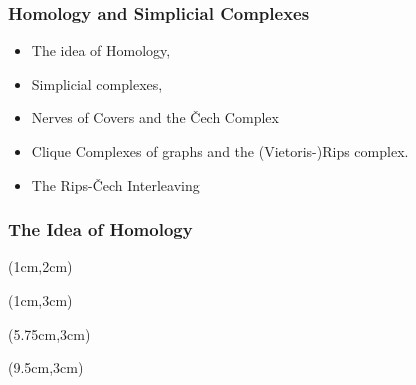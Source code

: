 
\begin{frame}
  \frametitle{Homology and Simplicial Complexes}

  \begin{itemize}
    \item The idea of Homology,
    \item Simplicial complexes,
    \item Nerves of Covers and the \v Cech Complex
    \item Clique Complexes of graphs and the (Vietoris-)Rips complex.
    \item The Rips-\v Cech Interleaving
  \end{itemize}
\end{frame}

\begin{frame}
  \frametitle{The Idea of Homology}


  \begin{textblock*}{11cm}(1cm,2cm)
  \end{textblock*}

  \begin{textblock*}{3cm}(1cm,3cm)
  \end{textblock*}
  \begin{textblock*}{3cm}(5.75cm,3cm)
  \end{textblock*}
  \begin{textblock*}{3cm}(9.5cm,3cm)
  \end{textblock*}


\end{frame}
